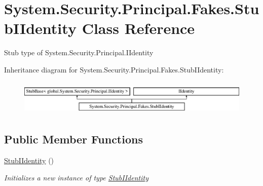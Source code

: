 \hypertarget{class_system_1_1_security_1_1_principal_1_1_fakes_1_1_stub_i_identity}{\section{System.\-Security.\-Principal.\-Fakes.\-Stub\-I\-Identity Class Reference}
\label{class_system_1_1_security_1_1_principal_1_1_fakes_1_1_stub_i_identity}
}


Stub type of System.\-Security.\-Principal.\-I\-Identity 


Inheritance diagram for System.\-Security.\-Principal.\-Fakes.\-Stub\-I\-Identity\-:\begin{figure}[H]
\begin{center}
\leavevmode
\includegraphics[height=1.712538cm]{class_system_1_1_security_1_1_principal_1_1_fakes_1_1_stub_i_identity}
\end{center}
\end{figure}
\subsection*{Public Member Functions}
\begin{DoxyCompactItemize}
\item 
\hyperlink{class_system_1_1_security_1_1_principal_1_1_fakes_1_1_stub_i_identity_a90013aea952fc0f36367b7325efb2c16}{Stub\-I\-Identity} ()
\begin{DoxyCompactList}\small\item\em Initializes a new instance of type \hyperlink{class_system_1_1_security_1_1_principal_1_1_fakes_1_1_stub_i_identity}{Stub\-I\-Identity}\end{DoxyCompactList}\end{DoxyCompactItemize}
